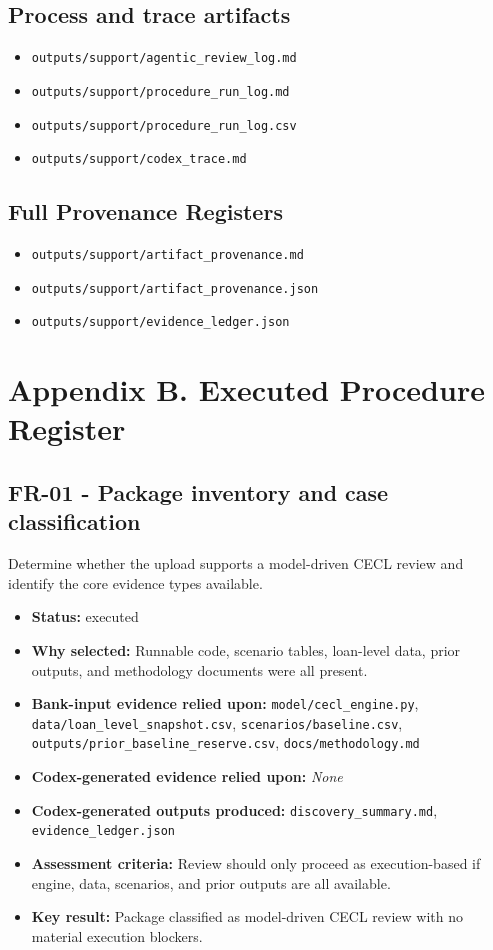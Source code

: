 \documentclass[11pt]{article}
\begin{document}
\subsection*{Process and trace artifacts}
\begin{itemize}
\item \texttt{outputs/support/agentic\_review\_log.md}
\item \texttt{outputs/support/procedure\_run\_log.md}
\item \texttt{outputs/support/procedure\_run\_log.csv}
\item \texttt{outputs/support/codex\_trace.md}
\end{itemize}
\subsection*{Full Provenance Registers}
\begin{itemize}
\item \texttt{outputs/support/artifact\_provenance.md}
\item \texttt{outputs/support/artifact\_provenance.json}
\item \texttt{outputs/support/evidence\_ledger.json}
\end{itemize}
\section*{Appendix B. Executed Procedure Register}
\subsection*{FR-01 - Package inventory and case classification}
Determine whether the upload supports a model-driven CECL review and identify the core evidence types available.
\begin{itemize}
\item \textbf{Status:} executed
\item \textbf{Why selected:} Runnable code, scenario tables, loan-level data, prior outputs, and methodology documents were all present.
\item \textbf{Bank-input evidence relied upon:} \texttt{model/cecl\_engine.py}, \texttt{data/loan\_level\_snapshot.csv}, \texttt{scenarios/baseline.csv}, \texttt{outputs/prior\_baseline\_reserve.csv}, \texttt{docs/methodology.md}
\item \textbf{Codex-generated evidence relied upon:} \textit{None}
\item \textbf{Codex-generated outputs produced:} \texttt{discovery\_summary.md}, \texttt{evidence\_ledger.json}
\item \textbf{Assessment criteria:} Review should only proceed as execution-based if engine, data, scenarios, and prior outputs are all available.
\item \textbf{Key result:} Package classified as model-driven CECL review with no material execution blockers.
\end{itemize}
\end{document}
